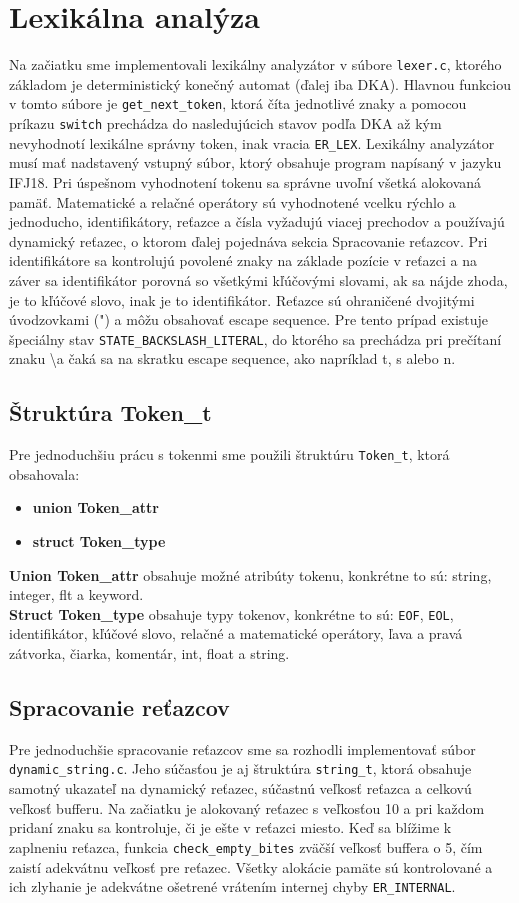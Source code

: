 \documentclass [11pt, a4paper]{article}
\begin{document}
\section{Lexikálna analýza}
Na začiatku sme implementovali lexikálny analyzátor v súbore \texttt{lexer.c}, ktorého základom je deterministický konečný automat (ďalej iba DKA).  Hlavnou funkciou v tomto súbore je \texttt{get\_next\_token}, ktorá číta jednotlivé znaky a pomocou príkazu \texttt{switch} prechádza do nasledujúcich stavov podľa DKA až kým nevyhodnotí  lexikálne správny token, inak vracia \texttt{ER\_LEX}. Lexikálny analyzátor musí mať nadstavený vstupný súbor, ktorý obsahuje program napísaný v jazyku IFJ18. Pri úspešnom vyhodnotení tokenu sa správne uvoľní všetká alokovaná pamäť. Matematické a relačné operátory sú vyhodnotené vcelku rýchlo a jednoducho, identifikátory, reťazce a čísla vyžadujú viacej prechodov a používajú dynamický reťazec, o ktorom ďalej pojednáva sekcia Spracovanie reťazcov. Pri identifikátore sa kontrolujú povolené znaky na základe pozície v reťazci a na záver sa identifikátor porovná so všetkými kľúčovými slovami, ak sa nájde zhoda, je to kľúčové slovo, inak je to identifikátor. Reťazce sú ohraničené dvojitými úvodzovkami (") a môžu obsahovať escape sequence. Pre tento prípad existuje špeciálny stav \texttt{STATE\_BACKSLASH\_LITERAL}, do ktorého sa prechádza pri  prečítaní znaku \textbackslash \quad a čaká sa na skratku escape sequence, ako napríklad t, s alebo n. 

\subsection{Štruktúra Token\_t}
Pre jednoduchšiu prácu s tokenmi sme použili štruktúru \texttt{Token\_t}, ktorá obsahovala:

\begin{itemize}
\item \textbf{union Token\_attr}
\item \textbf{struct Token\_type}
\end{itemize}
\textbf{Union Token\_attr} obsahuje možné atribúty tokenu, konkrétne to sú: string, integer, flt a keyword. \\
\textbf{Struct Token\_type} obsahuje typy tokenov, konkrétne to sú: \texttt{EOF}, \texttt{EOL}, identifikátor, kľúčové slovo, relačné a matematické operátory, ľava a pravá zátvorka, čiarka, komentár, int, float a string.


\subsection{Spracovanie reťazcov}
Pre jednoduchšie spracovanie reťazcov sme sa rozhodli implementovať súbor \texttt{dynamic\_string.c}. Jeho súčasťou je aj štruktúra \texttt{string\_t}, ktorá obsahuje samotný ukazateľ na dynamický reťazec, súčastnú veľkosť reťazca a celkovú veľkosť bufferu. Na začiatku je alokovaný reťazec s veľkosťou 10 a pri každom pridaní znaku sa kontroluje, či je ešte v reťazci miesto. Keď sa blížime k zaplneniu reťazca, funkcia \texttt{check\_empty\_bites} zväčší veľkosť buffera o 5, čím zaistí adekvátnu veľkosť pre reťazec. Všetky alokácie pamäte sú kontrolované a ich zlyhanie je adekvátne ošetrené vrátením internej chyby \texttt{ER\_INTERNAL}.
\end{document}
